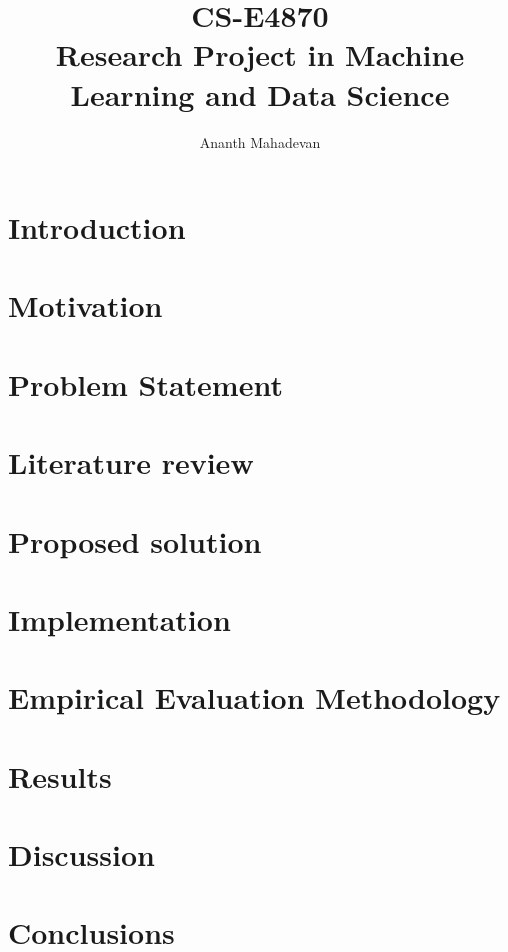 \documentclass[a4paper,11pt]{article}
\title{CS-E4870 \\
        \large Research Project in Machine Learning and Data Science}
\author{Ananth Mahadevan}
\begin{document}
\maketitle

\begin{abstract}
    \label{sec:abstract}
    
\end{abstract}

\section{Introduction}
\label{sec:introduction}


\section{Motivation}
\label{sec:motivation}


\section{Problem Statement}
\label{sec:problem-statement}

\section{Literature review}
\label{sec:literature-review}

\section{Proposed solution}
\label{sec:solution}

\section{Implementation}
\label{sec:implementation}

\section{Empirical Evaluation Methodology}
\label{sec:evaluation}

\section{Results}
\label{sec:results}


\section{Discussion}
\label{sec:discussion}


\section{Conclusions}
\label{sec:conclusion}
\end{document}
